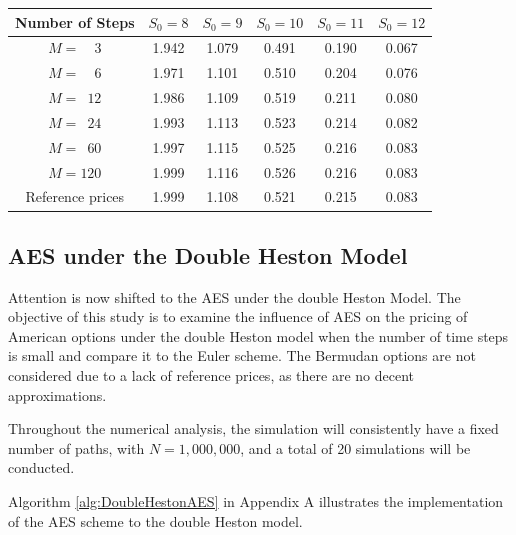 \documentclass[]{interact}
\theoremstyle{plain}%
\theoremstyle{definition}
\theoremstyle{remark}
\begin{document}
\begin{table}
{\begin{tabular}{cccccc} 
\toprule
Number of Steps & $S_0=8$ & $S_0=9$ & $S_0=10$ & $S_0=11$ & $S_0=12$ \\
\midrule
$M=\phantom{10}3$   & 1.942 & 1.079 & 0.491 & 0.190 & 0.067 \\
$M=\phantom{10}6$   & 1.971 & 1.101 & 0.510 & 0.204 & 0.076 \\
$M=\phantom{1}12$   & 1.986 & 1.109 & 0.519 & 0.211 & 0.080 \\
$M=\phantom{1}24$   & 1.993 & 1.113 & 0.523 & 0.214 & 0.082 \\
$M=\phantom{1}60$   & 1.997 & 1.115 & 0.525 & 0.216 & 0.083 \\
$M=120$             & 1.999 & 1.116 & 0.526 & 0.216 & 0.083 \\
\midrule
Reference prices    & 1.999 & 1.108 & 0.521 & 0.215 & 0.083 \\
\bottomrule
\end{tabular}}
\label{table:AmericanAndBermudanTable}
\end{table}




\subsection{AES under the Double Heston Model}

Attention is now shifted to the AES under the double Heston Model. The objective of this study is to examine the influence of AES on the pricing of American options under the double Heston model when the number of time steps is small and compare it to the Euler scheme. The Bermudan options are not considered due to a lack of reference prices, as there are no decent approximations.

Throughout the numerical analysis, the simulation will consistently have a fixed number of paths, with $N = 1,000,000$, and a total of 20 simulations will be conducted.

Algorithm \ref{alg:DoubleHestonAES} in Appendix A illustrates the implementation of the AES scheme to the double Heston model.
\end{document}
